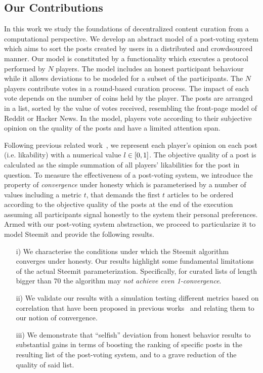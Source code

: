 \documentclass[a4paper,english,cleveref, autoref]{oasics-v2019}
\begin{document}
  \subsection{Our Contributions}
    In this work we study the foundations of decentralized content curation from
    a computational perspective. We develop an abstract model of a post-voting
    system which aims to sort the posts created by users in a distributed and
    crowdsourced manner. Our model is constituted by a functionality which
    executes a protocol performed by $N$ players. The model includes an honest
    participant behaviour while it allows deviations to be modeled for a subset
    of the participants. The $N$ players contribute votes in a round-based
    curation process. The impact of each vote depends on the number of coins
    held by the player. The posts are arranged in a list, sorted by the value of
    votes received, resembling the front-page model of Reddit or Hacker News. In
    the model, players vote according to their subjective opinion on the quality
    of the posts and have a limited attention span.

    Following previous related
    work~\cite{ghosh2011incentivizing,askalidis2013theoretical}, we represent
    each player's opinion on each post (i.e. likability) with a numerical value
    $l \in [ 0,1 ]$. The objective quality of a post is calculated as the
    simple summation of all players' likabilities for the post in question. To
    measure the effectiveness of a post-voting system, we introduce the property
    of \textit{convergence} under honesty which is parameterised by a number of
    values including a metric $t$, that demands the first $t$ articles to be
    ordered according to the objective quality of the posts at the end of the
    execution assuming all participants signal honestly to the system their
    personal preferences. Armed with our post-voting system abstraction, we
    proceed to particularize it to model Steemit and provide the following
    results.

    \begin{itemize}
      \item[i)] We characterise the conditions under which the Steemit algorithm
      converges under honesty. Our results highlight some fundamental
      limitations of the actual Steemit parameterization. Specifically, for
      curated lists of length bigger than 70 the algorithm may {\em not achieve
      even 1-convergence}.
      \item[ii)] We validate our results with a simulation testing different
      metrics based on correlation that have been proposed in previous
      works~\cite{kendall1955rank,spearman1904proof} and relating them to our
      notion of convergence.
      \item[iii)] We demonstrate that ``selfish'' deviation from honest behavior
      results to substantial gains in terms of boosting the ranking of specific
      posts in the resulting list of the post-voting system, and to a grave
      reduction of the quality of said list.
    \end{itemize}
\end{document}
